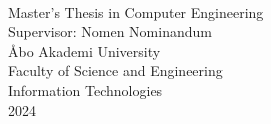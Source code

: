 \thispagestyle{empty}
\vspace*{3cm}

\begin{center}
	\begin{minipage}{0.6\textwidth}
		\centering
		{\Large\textbf{\MakeUppercase{\thetitle}}} \\
		\vspace{1em}\theauthor
	\end{minipage}
\end{center}

\vfill

\begin{flushright}
	Master's Thesis in Computer Engineering \\
	Supervisor: Nomen Nominandum \\
	Åbo Akademi University \\
	Faculty of Science and Engineering \\
	Information Technologies \\
	2024
\end{flushright}
